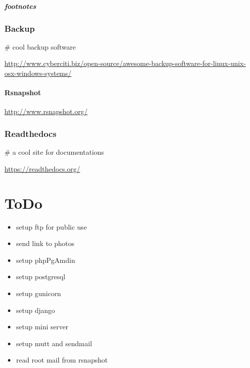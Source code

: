 \documentclass[letterpaper,10pt,english]{sphinxmanual}
\begin{document}
\paragraph{footnotes}


\subsection{Backup}
\label{sdocs/backup/backup:backup}\label{sdocs/backup/backup::doc}
\# cool backup software

\href{http://www.cyberciti.biz/open-source/awesome-backup-software-for-linux-unix-osx-windows-systems/}{http://www.cyberciti.biz/open-source/awesome-backup-software-for-linux-unix-osx-windows-systems/}


\subsubsection{Rsnapshot}
\label{sdocs/backup/rsnapshot/rsnapshot::doc}\label{sdocs/backup/rsnapshot/rsnapshot:rsnapshot}
\href{http://www.rsnapshot.org/}{http://www.rsnapshot.org/}


\subsection{Readthedocs}
\label{sdocs/readthedocs/readthedocs:readthedocs}\label{sdocs/readthedocs/readthedocs::doc}
\# a cool site for documentations

\href{https://readthedocs.org/}{https://readthedocs.org/}


\chapter{ToDo}
\label{index:todo}\begin{itemize}
\item {} 
setup ftp for public use

\item {} 
send link to photos

\item {} 
setup phpPgAmdin

\item {} 
setup postgresql

\item {} 
setup gunicorn

\item {} 
setup django

\item {} 
setup mini server

\item {} 
setup mutt and sendmail

\item {} 
read root mail from rsnapshot

\end{itemize}
\end{document}

